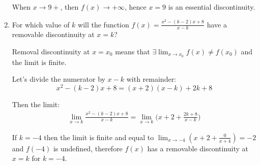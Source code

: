 \documentclass{article}
\begin{document}
\begin{enumerate}
When $x \to 9+$, then $f(x) \to +\infty$, hence $x=9$ is an essential discontinuity.

\item For which value of $k$ will the function $f(x) = \frac{x^2-(k-2)x+8}{x-k}$ have a removable discontinuity at $x=k$?

Removal discontinuity at $x=x_0$ means that $\exists \lim_{x \to x_0} f(x) \neq f(x_0)$ and the limit is finite.

Let's divide the numerator by $x-k$ with remainder:
\[x^2-(k-2)x+8 = (x + 2)(x - k) + 2k+8\]

Then the limit:
\begin{align*}
\lim_{x \to k} \frac{x^2-(k-2)x+8}{x-k} = \lim_{x \to k}\bigg(x + 2 + \frac{2k+8}{x-k}\bigg)
\end{align*}

If $k=-4$ then the limit is finite and equal to $\lim_{x \to -4}(x + 2 + \frac{0}{x + 4})=-2$ and $f(-4)$ is undefined, therefore $f(x)$ has a removable discontinuity at $x=k$ for $k=-4$.

\end{enumerate}
\end{document}
